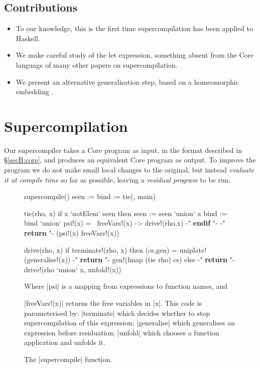 \subsection{Contributions}

\begin{itemize}
\item To our knowledge, this is the first time supercompilation has been applied to Haskell.
\item We make careful study of the let expression, something absent from the Core language of many other papers on supercompilation.
\item We present an alternative generalisation step, based on a homeomorphic embedding \cite{leuschel:homeomorphic}.
\end{itemize}


\section{Supercompilation}
\label{secS:optimisation}

Our supercompiler takes a Core program as input, in the format described in \S\ref{secB:core}, and produces an equivalent Core program as output. To improve the program we do not make small local changes to the original, but instead \textit{evaluate it at compile time} so far as possible, leaving a \textit{residual program} to be run.

\begin{figure}
\ignore\begin{code}
supercompile()
    seen := {}
    bind := {}
    tie({}, main)

tie(rho, x)
    if x `notElem` seen then
        seen := seen `union` {x}
        bind := bind `union` {psi\!!(x) = \ freeVars\!!(x) -> drive\!!(rho,x)}
    {-" \textsf{\textbf{endif}} "-}
    {-" \textsf{\textbf{return }} "-} (psi\!!(x) freeVars\!!(x))

drive(rho, x)
    if terminate\!!(rho, x) then
        (cs,gen) = uniplate\!!(generalise\!!(x))
        {-" \textsf{\textbf{return }} "-} gen\!!(fmap (tie rho) cs)
    else
        {-" \textsf{\textbf{return }} "-} drive\!!(rho `union` {x}, unfold\!!(x))
\end{code}

Where |psi| is a mapping from expressions to function names, and \ignore|freeVars\!!(x)| returns the free variables in |x|. This code is parameterised by: |terminate| which decides whether to stop supercompilation of this expression; |generalise| which generalises an expression before residuation; |unfold| which chooses a function application and unfolds it.
\vspace{3mm}
\caption{The |supercompile| function.}
\label{figS:supercompile}
\end{figure}

